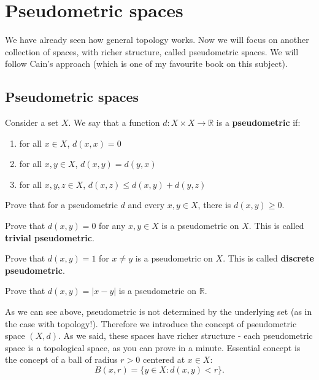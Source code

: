 
\chapter{Pseudometric spaces}
\label{pseudometric_spaces}
We have already seen how general topology works. Now we will focus on another collection of spaces, with richer structure, called pseudometric spaces.
We will follow Cain's approach (which is one of my favourite book on this subject).

\section{Pseudometric spaces}
Consider a set $X$. We say that a function $d : X\times X\to \mathbb R$ is a \textbf{pseudometric} if:
\begin{enumerate}
	\item for all $x\in X$,  $d(x,x)=0$
	\item for all $x,y\in X$, $d(x,y)=d(y,x)$
	\item for all $x,y,z\in X$, $d(x,z)\le d(x,y)+d(y,z)$
\end{enumerate}

\begin{prob}
	Prove that for a pseudometric $d$ and every $x,y\in X$, there is $d(x,y)\ge 0$.
\end{prob}

\begin{prob}
	Prove that $d(x,y)=0$ for any $x, y \in X$ is a pseudometric on $X$. This is called \textbf{trivial pseudometric}.
\end{prob}

\begin{prob}
	Prove that $d(x,y)=1$ for $x\neq y$ is a pseudometric on $X$. This is called \textbf{discrete pseudometric}.
\end{prob}

\begin{prob}
	Prove that $d(x,y)=|x-y|$ is a pseudometric on $\mathbb R$.
\end{prob}

As we can see above, pseudometric is not determined by the underlying set (as in the case with topology!). Therefore we introduce the concept of
pseudometric space $(X,d)$. As we said, these spaces have richer structure - each pseudometric space is a topological space, as you can prove in a minute.
Essential concept is the concept of a ball of radius $r>0$ centered at $x\in X$:
$$B(x, r) = \{y \in X : d(x,y) < r\}.$$


